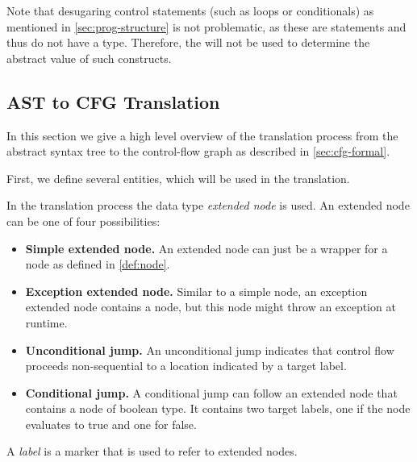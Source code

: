 Note that desugaring control statements (such as loops or conditionals) as mentioned
in \autoref{sec:prog-structure} is not problematic, as these are statements and thus do not
have a type.  Therefore, the  will not be used to determine
the abstract value of such constructs.





\subsection{AST to CFG Translation}
\label{sec:ast_to_cfg_translation}

In this section we give a high level overview of the translation process from the
abstract syntax tree to the control-flow graph as described in \autoref{sec:cfg-formal}.

First, we define several entities, which will be used in the translation.

\begin{definition}
    In the translation process the data type \emph{extended node} is used.
    An extended node can be one of four possibilities:
    \begin{itemize}
        \item \textbf{Simple extended node.} An extended node can just be a wrapper for a node
        as defined in \autoref{def:node}.
        \item \textbf{Exception extended node.} Similar to a simple node, an exception extended
        node contains a node, but this node might throw an exception at runtime.
        \item \textbf{Unconditional jump.} An unconditional jump indicates that control
        flow proceeds non-sequential to a location indicated by a target label.
        \item \textbf{Conditional jump.} A conditional jump can follow an extended node
        that contains a node of boolean type. It contains two target labels, one if the
        node evaluates to true and one for false.
    \end{itemize}
\end{definition}
\begin{definition}[Label]
    A \emph{label} is a marker that is used to refer to extended nodes.
\end{definition}


